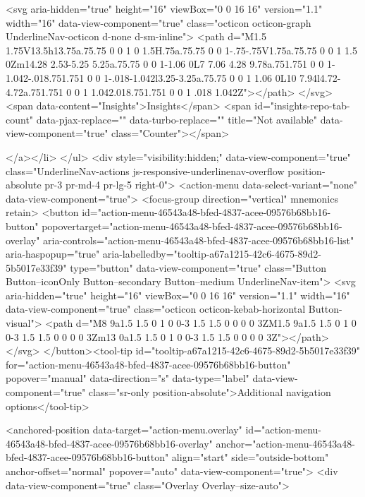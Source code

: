               <svg aria-hidden="true" height="16" viewBox="0 0 16 16" version="1.1" width="16" data-view-component="true" class="octicon octicon-graph UnderlineNav-octicon d-none d-sm-inline">
    <path d="M1.5 1.75V13.5h13.75a.75.75 0 0 1 0 1.5H.75a.75.75 0 0 1-.75-.75V1.75a.75.75 0 0 1 1.5 0Zm14.28 2.53-5.25 5.25a.75.75 0 0 1-1.06 0L7 7.06 4.28 9.78a.751.751 0 0 1-1.042-.018.751.751 0 0 1-.018-1.042l3.25-3.25a.75.75 0 0 1 1.06 0L10 7.94l4.72-4.72a.751.751 0 0 1 1.042.018.751.751 0 0 1 .018 1.042Z"></path>
</svg>
        <span data-content="Insights">Insights</span>
          <span id="insights-repo-tab-count" data-pjax-replace="" data-turbo-replace="" title="Not available" data-view-component="true" class="Counter"></span>


    
</a></li>
</ul>
    <div style="visibility:hidden;" data-view-component="true" class="UnderlineNav-actions js-responsive-underlinenav-overflow position-absolute pr-3 pr-md-4 pr-lg-5 right-0">      <action-menu data-select-variant="none" data-view-component="true">
  <focus-group direction="vertical" mnemonics retain>
    <button id="action-menu-46543a48-bfed-4837-acee-09576b68bb16-button" popovertarget="action-menu-46543a48-bfed-4837-acee-09576b68bb16-overlay" aria-controls="action-menu-46543a48-bfed-4837-acee-09576b68bb16-list" aria-haspopup="true" aria-labelledby="tooltip-a67a1215-42c6-4675-89d2-5b5017e33f39" type="button" data-view-component="true" class="Button Button--iconOnly Button--secondary Button--medium UnderlineNav-item">  <svg aria-hidden="true" height="16" viewBox="0 0 16 16" version="1.1" width="16" data-view-component="true" class="octicon octicon-kebab-horizontal Button-visual">
    <path d="M8 9a1.5 1.5 0 1 0 0-3 1.5 1.5 0 0 0 0 3ZM1.5 9a1.5 1.5 0 1 0 0-3 1.5 1.5 0 0 0 0 3Zm13 0a1.5 1.5 0 1 0 0-3 1.5 1.5 0 0 0 0 3Z"></path>
</svg>
</button><tool-tip id="tooltip-a67a1215-42c6-4675-89d2-5b5017e33f39" for="action-menu-46543a48-bfed-4837-acee-09576b68bb16-button" popover="manual" data-direction="s" data-type="label" data-view-component="true" class="sr-only position-absolute">Additional navigation options</tool-tip>


<anchored-position data-target="action-menu.overlay" id="action-menu-46543a48-bfed-4837-acee-09576b68bb16-overlay" anchor="action-menu-46543a48-bfed-4837-acee-09576b68bb16-button" align="start" side="outside-bottom" anchor-offset="normal" popover="auto" data-view-component="true">
  <div data-view-component="true" class="Overlay Overlay--size-auto">
    
